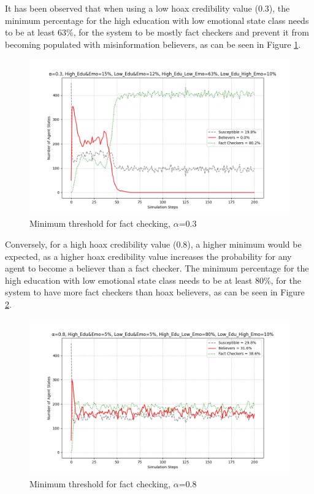 \documentclass[twocolumn, a4paper, 12pt]{article}
\begin{document}
It has been observed that when using a low hoax credibility value (0.3), the minimum percentage for the high education with low emotional state class needs to be at least 63\%, for the system to be mostly fact checkers and prevent it from becoming populated with misinformation believers, as can be seen in Figure \ref{fig:7}.

\begin{figure}[H]
    \centering
    \includegraphics[width=1\linewidth]{min_threshold_fact_checkers.png}
    \caption{Minimum threshold for fact checking, $\alpha$=0.3}
    \label{fig:7}
\end{figure}

Conversely, for a high hoax credibility value (0.8), a higher minimum would be expected, as a higher hoax credibility value increases the probability for any agent to become a believer than a fact checker. The minimum percentage for the high education with low emotional state class needs to be at least 80\%, for the system to have more fact checkers than hoax believers, as can be seen in Figure \ref{fig:8}.

\begin{figure}[H]
    \centering
    \includegraphics[width=1\linewidth]{high_alpha_min_threshold.png}
    \caption{Minimum threshold for fact checking, $\alpha$=0.8}
    \label{fig:8}
\end{figure}
\end{document}
